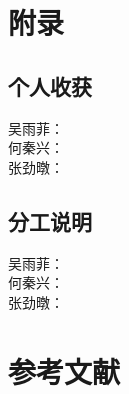 \documentclass[a4paper]{article}
\begin{document}
   \section{附录}
    \subsection{个人收获}
    吴雨菲：\\
    何秦兴：\\
    张劲暾：
   	\subsection{分工说明}
 	吴雨菲：\\
    何秦兴：\\
    张劲暾：
   \section{参考文献}
\end{document}
